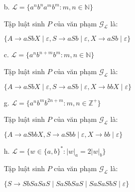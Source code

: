\documentclass[12pt, a4paper]{article}
\begin{document}
\begin{itemize}
\begin{itemize}
			\item[b.] $\mathcal{L} = \{ a^nb^na^mb^m: m, n \in \mathbb{N} \}$
			
			Tập luật sinh $P$ của văn phạm $\mathcal{G}_{\mathcal{L}}$ là: 
			
			$\{
			A \rightarrow aSbX \mid \varepsilon,
			S \rightarrow aSb \mid \varepsilon,
			X \rightarrow aSb \mid \varepsilon
			\}$	
			
			\item[c.] $\mathcal{L} = \{ a^nb^{n + m}b^m: m, n \in \mathbb{N} \}$
			
			Tập luật sinh $P$ của văn phạm $\mathcal{G}_{\mathcal{L}}$ là: 
			
			$\{
			A \rightarrow aSbX \mid \varepsilon,
			S \rightarrow aSb \mid \varepsilon,
			X \rightarrow bbX \mid \varepsilon
			\}$
			
			\item[g.] $\mathcal{L} = \{ a^nb^mb^{2n + m}: m, n \in \mathbb{Z}^+ \}$
			
			Tập luật sinh $P$ của văn phạm $\mathcal{G}_{\mathcal{L}}$ là: 
			
			$\{
			A \rightarrow aSbbX,
			S \rightarrow aSbb \mid \varepsilon,
			X \rightarrow bb \mid \varepsilon
			\}$
			
			\item[h.] $\mathcal{L} = \{ w \in \{a, b\}^*: |w|_a = 2|w|_b \}$
			
			Tập luật sinh $P$ của văn phạm $\mathcal{G}_{\mathcal{L}}$ là: 
			
			$\{
			S \rightarrow SbSaSaS \mid SaSbSaS \mid SaSaSbS \mid \varepsilon
			\}$
			
		\end{itemize}
			
	\end{itemize}
	
\end{document}
